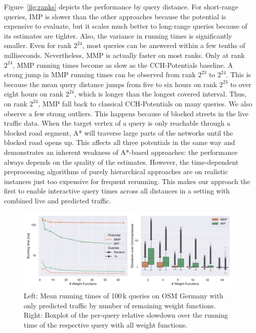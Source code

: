 \documentclass[a4paper,UKenglish,cleveref, autoref, thm-restate,anonymous]{lipics-v2021}
\begin{document}
Figure~\ref{fig:ranks} depicts the performance by query distance.
For short-range queries, IMP is slower than the other approaches because the potential is expensive to evaluate, but it scales much better to long-range queries because of its estimates are tighter.
Also, the variance in running times is significantly smaller.
Even for rank $2^{24}$, most queries can be answered within a few tenths of milliseconds.
Nevertheless, MMP is actually faster on most ranks.
Only at rank $2^{24}$, MMP running times become as slow as the CCH-Potentials baseline.
A strong jump in MMP running times can be observed from rank $2^{23}$ to $2^{24}$.
This is because the mean query distance jumps from five to six hours on rank $2^{23}$ to over eight hours on rank $2^{24}$, which is longer than the longest covered interval.
Thus, on rank $2^{24}$, MMP fall back to classical CCH-Potentials on many queries.
We also observe a few strong outliers.
This happens because of blocked streets in the live traffic data.
When the target vertex of a query is only reachable through a blocked road segment, A* will traverse large parts of the networks until the blocked road opens up.
This affects all three potentials in the same way and demonstrates an inherent weakness of A*-based approaches: the performance always depends on the quality of the estimates.
However, the time-dependent preprocessing algorithms of purely hierarchical approaches are on realistic instances just too expensive for frequent rerunning.
This makes our approach the first to enable interactive query times across all distances in a setting with combined live and predicted traffic.

\begin{figure}[!t]
\centering
\includegraphics[width=\linewidth]{fig/compression.pdf}
\caption{
Left: Mean running times of 100\,k queries on OSM Germany with only predicted traffic by number of remaining weight functions.
Right: Boxplot of the per-query relative slowdown over the running time of the respective query with all weight functions.
}\label{fig:compression}
\end{figure}
\end{document}
